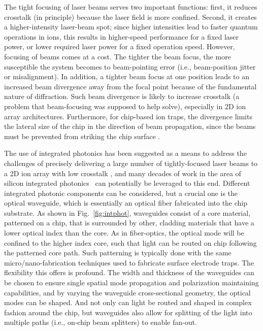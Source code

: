 \documentclass[%
reprint,
 amsmath,amssymb,
]{revtex4-1}
\begin{document}
The tight focusing of laser beams serves two important functions: first, it reduces crosstalk (in principle) because the laser field is more confined.  Second, it creates a higher-intensity laser-beam spot; since higher intensities lead to faster quantum operations in ions, this results in higher-speed performance for a fixed laser power, or lower required laser power for a fixed operation speed.  However, focusing of beams comes at a cost.  The tighter the beam focus, the more susceptible the system becomes to beam-pointing error (i.e., beam-position jitter or  misalignment).  In addition, a tighter beam focus at one position leads to an increased beam divergence away from the focal point because of the fundamental nature of diffraction.  Such beam divergence is likely to increase crosstalk (a problem that beam-focusing was supposed to help solve), especially in 2D ion array architectures.  Furthermore, for chip-based ion traps, the divergence limits the lateral size of the chip in the direction of beam propagation, since the beams must be prevented from striking the chip surface \cite{BrownCodesign2016, GuiseBallGrid2015}.

The use of integrated photonics has been suggested as a means to address the challenges of precisely delivering a large number of tightly-focused laser beams to a 2D ion array with low crosstalk \cite{KielpinskiIntPhotonArch2016, MehtaIntegrated2016,MehtaThesis2017}, and many decades of work in the area of silicon integrated photonics~\cite{ThomsonSiPhotonicsReview2016} can potentially be leveraged to this end.  Different integrated photonic components can be considered, but a crucial one is the optical waveguide, which is essentially an optical fiber fabricated into the chip substrate.  As shown in Fig.~\ref{fig:intphot}, waveguides consist of a core material, patterned on a chip, that is surrounded by other, cladding materials that have a lower optical index than the core.  As in fiber-optics, the optical mode will be confined to the higher index core, such that light can be routed on chip following the patterned core path.  Such patterning is typically done with the same micro/nano-fabrication techniques used to fabricate surface electrode traps.   The flexibility this offers is profound.  The width and thickness of the waveguides can be chosen to ensure single spatial mode propagation and polarization maintaining capabilities, and by varying the waveguide cross-sectional geometry, the optical modes can be shaped. And not only can light be routed and shaped in complex fashion around the chip, but waveguides also allow for splitting of the light into multiple paths (i.e., on-chip beam splitters) to enable fan-out.
\end{document}
